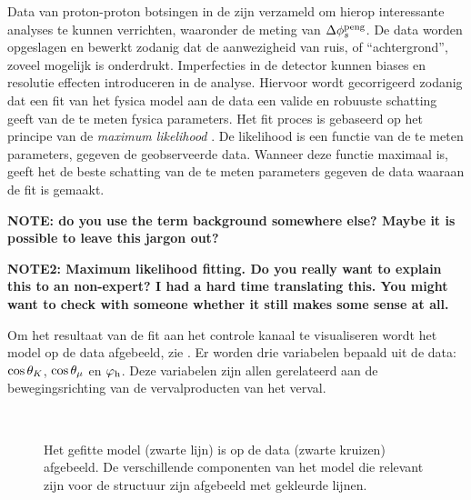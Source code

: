 Data van proton-proton botsingen in de \lhc zijn verzameld om hierop interessante analyses te kunnen verrichten, waaronder de meting van  $\Delta\phi_{s}^{\tiny\text{peng}}$. De data worden opgeslagen en bewerkt zodanig dat de aanwezigheid van ruis, of ``achtergrond'', zoveel mogelijk is onderdrukt. Imperfecties in de detector kunnen biases en resolutie effecten introduceren in de analyse. Hiervoor wordt gecorrigeerd zodanig dat een fit van het fysica model aan de data een valide en robuuste schatting geeft van de te meten fysica parameters. Het fit proces is gebaseerd op het principe van de {\it maximum likelihood} \cite{cowan1998statistical}. De likelihood is een functie van de te meten parameters, gegeven de geobserveerde data. Wanneer deze functie maximaal is, geeft het de beste schatting van de te meten parameters gegeven de data waaraan de fit is gemaakt.


\textbf{NOTE: do you use the term background somewhere else? Maybe it is possible to leave this jargon out?}

\textbf{NOTE2: Maximum likelihood fitting. Do you really want to explain this to an non-expert? I had a hard time translating this. You might want to check with someone whether it still makes some sense at all. }

Om het resultaat van de fit aan het \BsJpsiKst controle kanaal te visualiseren wordt het model op de data afgebeeld, zie . Er worden drie variabelen bepaald uit de data: $\cos\theta_{K}$, $\cos\theta_{\mu}$ en $\varphi_{\rm h}$. Deze variabelen zijn allen gerelateerd aan de bewegingsrichting van de vervalproducten van het \BsJpsiKst verval.

\begin{figure}[!t]
  \begin{subfigure}{0.5\textwidth}
    \centering
    \scalebox{1.2}{}
  \end{subfigure}%
  \hfill
  \begin{subfigure}{0.5\textwidth}
    \centering
    \scalebox{1.2}{}
  \end{subfigure}\\
  \begin{subfigure}{\textwidth}
    \centering
    \scalebox{1.2}{}
  \end{subfigure}
  \caption{Het gefitte model (zwarte lijn) is op de \BsJpsiKst data (zwarte kruizen) afgebeeld. De verschillende componenten van het model die relevant zijn voor de \CP structuur zijn afgebeeld met gekleurde lijnen.}
  \label{app_angular_plot_thetas}
\end{figure}



